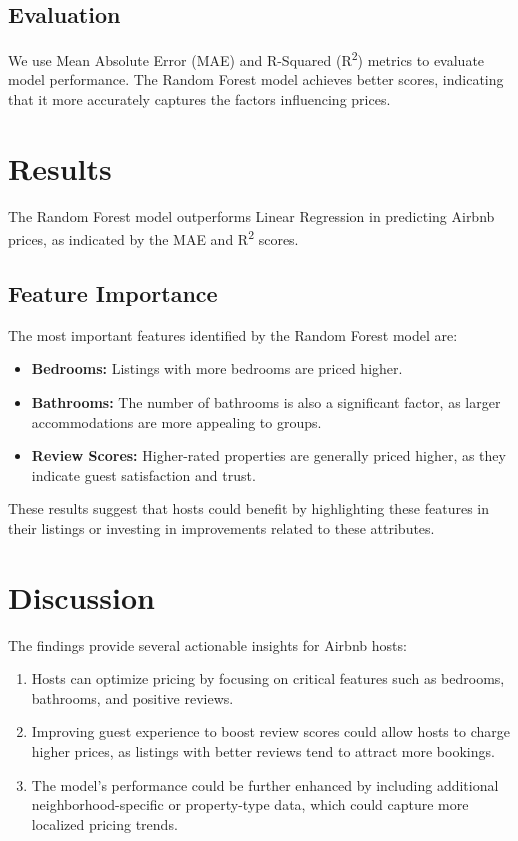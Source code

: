 \documentclass[12pt]{article}
\begin{document}
\subsection{Evaluation}
We use Mean Absolute Error (MAE) and R-Squared (R\textsuperscript{2}) metrics to evaluate model performance. The Random Forest model achieves better scores, indicating that it more accurately captures the factors influencing prices.

\section{Results}
The Random Forest model outperforms Linear Regression in predicting Airbnb prices, as indicated by the MAE and R\textsuperscript{2} scores.

\subsection{Feature Importance}
The most important features identified by the Random Forest model are:
\begin{itemize}
    \item \textbf{Bedrooms:} Listings with more bedrooms are priced higher.
    \item \textbf{Bathrooms:} The number of bathrooms is also a significant factor, as larger accommodations are more appealing to groups.
    \item \textbf{Review Scores:} Higher-rated properties are generally priced higher, as they indicate guest satisfaction and trust.
\end{itemize}

These results suggest that hosts could benefit by highlighting these features in their listings or investing in improvements related to these attributes.

\section{Discussion}
The findings provide several actionable insights for Airbnb hosts:
\begin{enumerate}
    \item Hosts can optimize pricing by focusing on critical features such as bedrooms, bathrooms, and positive reviews.
    \item Improving guest experience to boost review scores could allow hosts to charge higher prices, as listings with better reviews tend to attract more bookings.
    \item The model’s performance could be further enhanced by including additional neighborhood-specific or property-type data, which could capture more localized pricing trends.
\end{enumerate}
\end{document}
